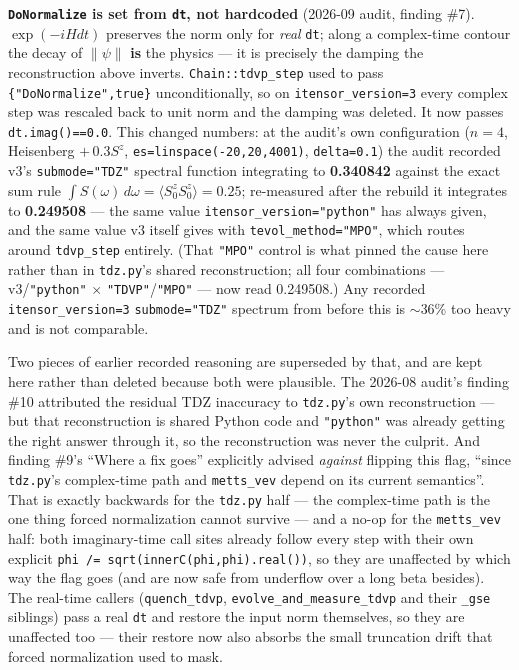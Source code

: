 \documentclass[11pt]{article}
\begin{document}
\textbf{\texttt{DoNormalize} is set from \texttt{dt}, not hardcoded}
(2026-09 audit, finding \#7). $\exp(-iHdt)$ preserves the norm only for
\emph{real} \texttt{dt}; along a complex-time contour the decay of
$\|\psi\|$ \textbf{is} the physics --- it is precisely the damping the
reconstruction above inverts. \texttt{Chain::tdvp\_step} used to pass
\texttt{\{"DoNormalize",true\}} unconditionally, so on
\texttt{itensor\_version=3} every complex step was rescaled back to unit
norm and the damping was deleted. It now passes
\texttt{dt.imag()==0.0}. This changed numbers: at the audit's own
configuration ($n=4$, Heisenberg $+\,0.3S^z$,
\texttt{es=linspace(-20,20,4001)}, \texttt{delta=0.1}) the audit recorded
v3's \texttt{submode="TDZ"} spectral function integrating to
\textbf{0.340842}
against the exact sum rule $\int S(\omega)\,d\omega = \langle S^z_0
S^z_0\rangle = 0.25$; re-measured after the rebuild it integrates to
\textbf{0.249508} --- the same value \texttt{itensor\_version="python"}
has always given, and the same value v3 itself gives with
\texttt{tevol\_method="MPO"}, which routes around \texttt{tdvp\_step}
entirely. (That \texttt{"MPO"} control is what pinned the cause here
rather than in \texttt{tdz.py}'s shared reconstruction; all four
combinations --- v3/\texttt{"python"} $\times$
\texttt{"TDVP"}/\texttt{"MPO"} --- now read 0.249508.) Any recorded
\texttt{itensor\_version=3} \texttt{submode="TDZ"} spectrum from before
this is $\sim$36\% too heavy and is not comparable.

Two pieces of earlier recorded reasoning are superseded by that, and are
kept here rather than deleted because both were plausible. The 2026-08
audit's finding \#10 attributed the residual TDZ inaccuracy to
\texttt{tdz.py}'s own reconstruction --- but that reconstruction is
shared Python code and \texttt{"python"} was already getting the right
answer through it, so the reconstruction was never the culprit. And
finding \#9's ``Where a fix goes'' explicitly advised \emph{against}
flipping this flag, ``since \texttt{tdz.py}'s complex-time path and
\texttt{metts\_vev} depend on its current semantics''. That is exactly
backwards for the \texttt{tdz.py} half --- the complex-time path is the
one thing forced normalization cannot survive --- and a no-op for the
\texttt{metts\_vev} half: both imaginary-time call sites already follow
every step with their own explicit
\texttt{phi /= sqrt(innerC(phi,phi).real())}, so they are unaffected by
which way the flag goes (and are now safe from underflow over a long
beta besides). The real-time callers (\texttt{quench\_tdvp},
\texttt{evolve\_and\_measure\_tdvp} and their \texttt{\_gse} siblings)
pass a real \texttt{dt} and restore the input norm themselves, so they
are unaffected too --- their restore now also absorbs the small
truncation drift that forced normalization used to mask.
\end{document}
